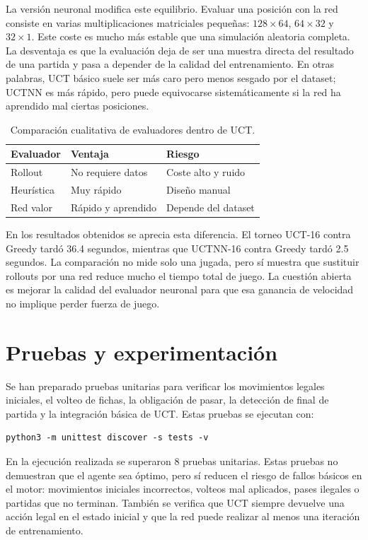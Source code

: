 \documentclass[conference,a4paper]{IEEEtran}
\begin{document}
La versión neuronal modifica este equilibrio. Evaluar una posición con la red
consiste en varias multiplicaciones matriciales pequeñas: \(128 \times 64\),
\(64 \times 32\) y \(32 \times 1\). Este coste es mucho más estable que una
simulación aleatoria completa. La desventaja es que la evaluación deja de ser
una muestra directa del resultado de una partida y pasa a depender de la calidad
del entrenamiento. En otras palabras, UCT básico suele ser más caro pero menos
sesgado por el dataset; UCTNN es más rápido, pero puede equivocarse
sistemáticamente si la red ha aprendido mal ciertas posiciones.

\begin{table}[h]
\centering
\caption{Comparación cualitativa de evaluadores dentro de UCT.}
\label{tab:evaluadores}
\begin{tabular}{lll}
\toprule
Evaluador & Ventaja & Riesgo \\
\midrule
Rollout & No requiere datos & Coste alto y ruido \\
Heurística & Muy rápido & Diseño manual \\
Red valor & Rápido y aprendido & Depende del dataset \\
\bottomrule
\end{tabular}
\end{table}

En los resultados obtenidos se aprecia esta diferencia. El torneo UCT-16 contra
Greedy tardó 36.4 segundos, mientras que UCTNN-16 contra Greedy tardó 2.5
segundos. La comparación no mide solo una jugada, pero sí muestra que sustituir
rollouts por una red reduce mucho el tiempo total de juego. La cuestión abierta
es mejorar la calidad del evaluador neuronal para que esa ganancia de velocidad
no implique perder fuerza de juego.

\section{Pruebas y experimentación}

Se han preparado pruebas unitarias para verificar los movimientos legales
iniciales, el volteo de fichas, la obligación de pasar, la detección de final de
partida y la integración básica de UCT. Estas pruebas se ejecutan con:

\begin{verbatim}
python3 -m unittest discover -s tests -v
\end{verbatim}

En la ejecución realizada se superaron 8 pruebas unitarias. Estas pruebas no
demuestran que el agente sea óptimo, pero sí reducen el riesgo de fallos
básicos en el motor: movimientos iniciales incorrectos, volteos mal aplicados,
pases ilegales o partidas que no terminan. También se verifica que UCT siempre
devuelve una acción legal en el estado inicial y que la red puede realizar al
menos una iteración de entrenamiento.
\end{document}
